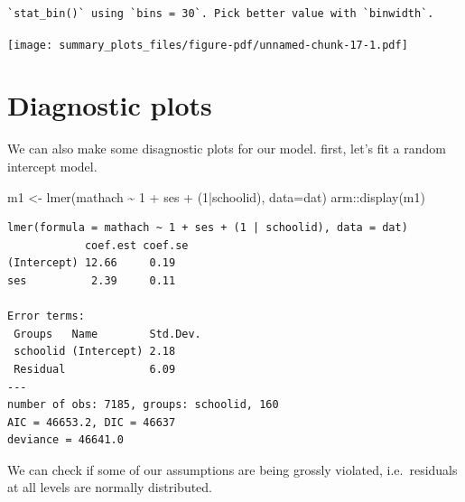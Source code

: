 \documentclass[
  letterpaper,
  DIV=11,
  numbers=noendperiod]{scrreprt}
\newenvironment{Shaded}{}{}
\newcommand{\AttributeTok}[1]{\textcolor[rgb]{0.49,0.56,0.16}{#1}}
\newcommand{\DecValTok}[1]{\textcolor[rgb]{0.25,0.63,0.44}{#1}}
\newcommand{\FunctionTok}[1]{\textcolor[rgb]{0.02,0.16,0.49}{#1}}
\newcommand{\NormalTok}[1]{#1}
\newcommand{\OtherTok}[1]{\textcolor[rgb]{0.00,0.44,0.13}{#1}}
\newcommand{\SpecialCharTok}[1]{\textcolor[rgb]{0.25,0.44,0.63}{#1}}
\newcommand{\StringTok}[1]{\textcolor[rgb]{0.25,0.44,0.63}{#1}}
\begin{document}
\begin{verbatim}
`stat_bin()` using `bins = 30`. Pick better value with `binwidth`.
\end{verbatim}

\texttt{[image: summary\_plots\_files/figure-pdf/unnamed-chunk-17-1.pdf]}

\section{Diagnostic plots}\label{diagnostic-plots}

We can also make some disagnostic plots for our model. first, let's fit
a random intercept model.

\begin{Shaded}
\begin{Highlighting}[]
\NormalTok{m1 }\OtherTok{\textless{}{-}} \FunctionTok{lmer}\NormalTok{(mathach }\SpecialCharTok{\textasciitilde{}} \DecValTok{1} \SpecialCharTok{+}\NormalTok{ ses }\SpecialCharTok{+}\NormalTok{ (}\DecValTok{1}\SpecialCharTok{|}\NormalTok{schoolid), }\AttributeTok{data=}\NormalTok{dat)}
\NormalTok{arm}\SpecialCharTok{::}\FunctionTok{display}\NormalTok{(m1)}
\end{Highlighting}
\end{Shaded}

\begin{verbatim}
lmer(formula = mathach ~ 1 + ses + (1 | schoolid), data = dat)
            coef.est coef.se
(Intercept) 12.66     0.19  
ses          2.39     0.11  

Error terms:
 Groups   Name        Std.Dev.
 schoolid (Intercept) 2.18    
 Residual             6.09    
---
number of obs: 7185, groups: schoolid, 160
AIC = 46653.2, DIC = 46637
deviance = 46641.0 
\end{verbatim}

We can check if some of our assumptions are being grossly violated,
i.e.~residuals at all levels are normally distributed.

\begin{Shaded}
\end{Shaded}
\end{document}
